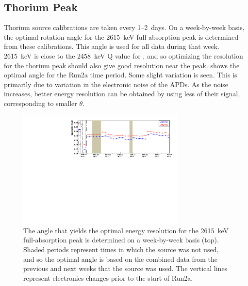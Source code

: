 \documentclass[herrin-thesis.tex]{subfiles}
\begin{document}
\subsection{Thorium Peak}
Thorium source calibrations are taken every 1--2~days. On a week-by-week basis, the optimal rotation angle for the \SI{2615}{\keV} full absorption peak is determined from these calibrations. This angle is used for all data during that week. \SI{2615}{\keV} is close to the \SI{2458}{\keV} Q value for , and so optimizing the resolution for the thorium peak should also give good resolution near the \zeronu{} peak.  shows the optimal angle for the Run2a time period. Some slight variation is seen. This is primarily due to variation in the electronic noise of the APDs. As the noise increases, better energy resolution can be obtained by using less of their signal, corresponding to smaller \(\theta\).

\begin{figure}[htp]
\centering
	\includegraphics[width=0.75\textwidth]{./plots/data_theta_v_time.pdf}
	\caption[Optimal rotation angle and resulting full-absorption peak energy]{The angle that yields the optimal energy resolution for the \SI{2615}{\keV}  full-absorption peak is determined on a week-by-week basis (top). Shaded periods represent times in which the  source was not used, and so the optimal angle is based on the combined data from the previous and next weeks that the  source was used. The vertical lines represent electronics changes prior to the start of Run2a.}
	\label{fig:data_theta_v_time}
\end{figure}
\end{document}
